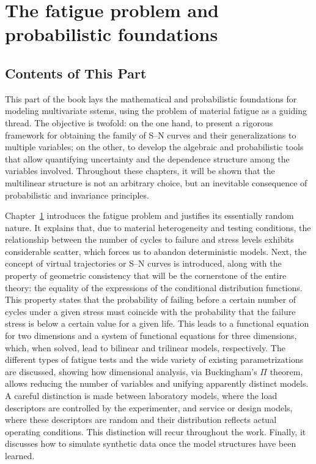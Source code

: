 \startcontents[chapter]
\chapter{The fatigue problem and probabilistic foundations}
\label{ch:fatigue_foundations}
\minitocboxed

\section*{Contents of This Part}

This part of the book lays the mathematical and probabilistic foundations for modeling multivariate sstems, using the problem of material fatigue as a guiding thread. The objective is twofold: on the one hand, to present a rigorous framework for obtaining the family of S–N curves and their generalizations to multiple variables; on the other, to develop the algebraic and probabilistic tools that allow quantifying uncertainty and the dependence structure among the variables involved. Throughout these chapters, it will be shown that the multilinear structure is not an arbitrary choice, but an inevitable consequence of probabilistic and invariance principles.

Chapter~\ref{ch:fatigue_foundations} introduces the fatigue problem and justifies its essentially random nature. It explains that, due to material heterogeneity and testing conditions, the relationship between the number of cycles to failure and stress levels exhibits considerable scatter, which forces us to abandon deterministic models. Next, the concept of virtual trajectories or S–N curves is introduced, along with the property of geometric consistency that will be the cornerstone of the entire theory: the equality of the expressions of the conditional distribution functions. This property states that the probability of failing before a certain number of cycles under a given stress must coincide with the probability that the failure stress is below a certain value for a given life. This leads to a functional equation for two dimensions and a system of functional equations for three dimensions, which, when solved, lead to bilinear and trilinear models, respectively. The different types of fatigue tests and the wide variety of existing parametrizations are discussed, showing how dimensional analysis, via Buckingham's $\Pi$ theorem, allows reducing the number of variables and unifying apparently distinct models. A careful distinction is made between laboratory models, where the load descriptors are controlled by the experimenter, and service or design models, where these descriptors are random and their distribution reflects actual operating conditions. This distinction will recur throughout the work. Finally, it discusses how to simulate synthetic data once the model structures have been learned.

